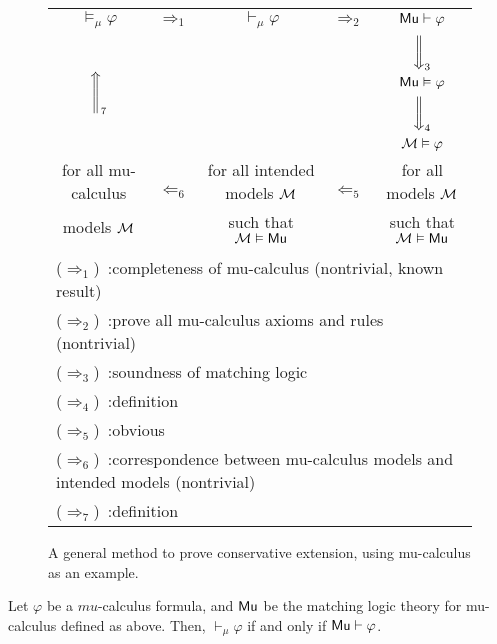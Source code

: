 \documentclass{amsart}
\begin{document}
\begin{figure}
	\begin{tabular}{|ccccc|}
		\hline
		$\vDash_\mu \varphi$ &
		$\Longrightarrow_1$ &
		$\vdash_\mu \varphi$ &
		$\Longrightarrow_2$ &
		$\mathsf{Mu} \vdash \varphi$ \\
		\multirow{4}{*}{$\Bigg\Uparrow_7$}
		&&
		\multirow{4}{*}{\scalebox{3}{$\circlearrowright$}}
		&&$\bigg\Downarrow_3$ \\
		&&&&$\mathsf{Mu} \vDash \varphi$ \\
		&&&&$\bigg\Downarrow_4$ \\
		$\MM \vDash_\mu \varphi$ &
		\multirow{3}{*}{$\Longleftarrow_6$} &
		$\MM \vDash \varphi$ &
		\multirow{3}{*}{$\Longleftarrow_5$} &
		$\MM \vDash \varphi$
		\\
		for all mu-calculus &&
		for all intended models $\mathcal{M}$ &&
		for all models $\mathcal{M}$
		\\
		models $\mathcal{M}$
		&&
		such that $\mathcal{M} \vDash \mathsf{Mu}$
		&&
		such that $\mathcal{M} \vDash \mathsf{Mu}$
		\\ &&&&
		\\
		\multicolumn{5}{|l|}{
			($\Longrightarrow_1$)\ :\quad completeness of mu-calculus (nontrivial, known
			result)
		}\\
		\multicolumn{5}{|l|}{
			($\Longrightarrow_2$)\ :\quad prove all mu-calculus axioms and rules
			(nontrivial)
		}\\
		\multicolumn{5}{|l|}{
			($\Longrightarrow_3$)\ :\quad soundness of matching logic
		}\\
		\multicolumn{5}{|l|}{
			($\Longrightarrow_4$)\ :\quad definition
		}\\
		\multicolumn{5}{|l|}{
			($\Longrightarrow_5$)\ :\quad obvious
		}\\
		\multicolumn{5}{|l|}{
			($\Longrightarrow_6$)\ :\quad correspondence between mu-calculus models and
			intended models (nontrivial)
		}\\
		\multicolumn{5}{|l|}{
			($\Longrightarrow_7$)\ :\quad definition
		}
		\\\hline
	\end{tabular}
	\caption{
		A general method to prove conservative extension, using mu-calculus as an
		example.}
	\label{fig_general_method_conservative_extension}
\end{figure}

\begin{theorem}
	
	Let $\varphi$ be a $mu$-calculus formula, and $\mathsf{Mu}$ be the matching logic
	theory
	for mu-calculus defined as above.
	Then, $\vdash_\mu \varphi$ if and only if $\mathsf{Mu} \vdash \varphi$.
\end{theorem}
\end{document}
